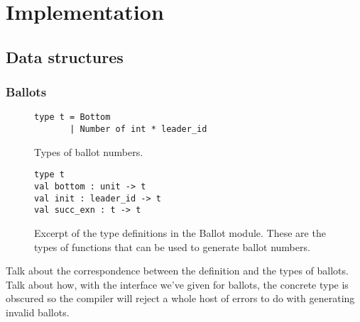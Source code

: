 \chapter{Implementation}

\section{Data structures}

\subsection{Ballots}

\begin{figure}[h]
  \begin{lstlisting}
type t = Bottom
       | Number of int * leader_id
  \end{lstlisting}
    \caption{Types of ballot numbers.}
  \centering
\end{figure}

\begin{figure}[h]
  \begin{lstlisting}
type t
val bottom : unit -> t
val init : leader_id -> t
val succ_exn : t -> t
  \end{lstlisting}
    \caption{Excerpt of the type definitions in the Ballot module. These are the types of functions that can be used to generate ballot numbers.}
  \centering
\end{figure}

Talk about the correspondence between the definition and the types of ballots. Talk about how, with the interface
we've given for ballots, the concrete type is obscured so the compiler will reject a whole host of errors to do with
generating invalid ballots.





